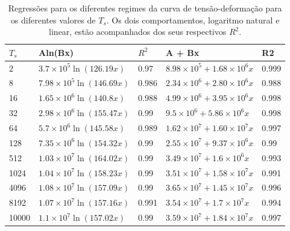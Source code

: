 \documentclass[11pt,a4paper]{article} %
\begin{document}
        \begin{table}[H]
            \caption{Regressões para os diferentes regimes da curva de tensão-deformação para os diferentes valores de \(T_{s}\). Os dois comportamentos, logaritmo natural e linear, estão acompanhados dos seus respectivos \(R^{2}\).}
            \centering
            \label{tab2}
            \begin{tabular}{lllll}
                \hline
                \textbf{\(T_{s}\)} & \textbf{Aln(Bx)} & \textbf{\(R^{2}\)} & \textbf{A + Bx} & \textbf{R2} \\ \hline
                2     & \(3.7 \times 10^{5} \ln(126.19x)\)   & 0.97  & \(8.98 \times 10^{5} + 1.68 \times 10^{6}x\) & 0.999 \\
                8     & \(7.98 \times 10^{5} \ln(146.69x)\)  & 0.986 & \(2.34 \times 10^{6} + 2.80 \times 10^{6}x\) & 0.988 \\
                16    & \(1.65 \times 10^{6} \ln(140.8x)\)  & 0.988 & \(4.99 \times 10^{6} + 3.95 \times 10^{6}x\) & 0.998 \\
                32    & \(2.98 \times 10^{6} \ln(155.47x)\) & 0.99  & \(9.5 \times 10^{6} + 5.86 \times 10^{6}x\)  & 0.998 \\
                64    & \(5.7 \times 10^{6} \ln(145.58x)\)  & 0.989 & \(1.62 \times 10^{7} + 1.60 \times 10^{7}x\) & 0.997 \\
                128   & \(7.35 \times 10^{6} \ln(154.32x)\) & 0.99  & \(2.55 \times 10^{7} + 9.37 \times 10^{6}x\) & 0.99 \\
                512   & \(1.03 \times 10^{7} \ln(164.02x)\) & 0.99  & \(3.49 \times 10^{7} + 1.6 \times 10^{6}x\)  & 0.993 \\
                1024  & \(1.04 \times 10^{7} \ln(158.23x)\) & 0.99  & \(3.51 \times 10^{7} + 1.58 \times 10^{7}x\) & 0.991 \\
                4096  & \(1.08 \times 10^{7} \ln(157.09x)\) & 0.99  & \(3.65 \times 10^{7} + 1.45 \times 10^{7}x\) & 0.996 \\
                8192  & \(1.07 \times 10^{7} \ln(157.16x)\) & 0.991 & \(3.54 \times 10^{7} + 1.7 \times 10^{7}x\)  & 0.994 \\
                10000 & \(1.1 \times 10^{7} \ln(157.02x)\)  & 0.99  & \(3.59 \times 10^{7} + 1.84 \times 10^{7}x\) & 0.997 \\ \hline
            \end{tabular}
        \end{table}
        
\end{document}

